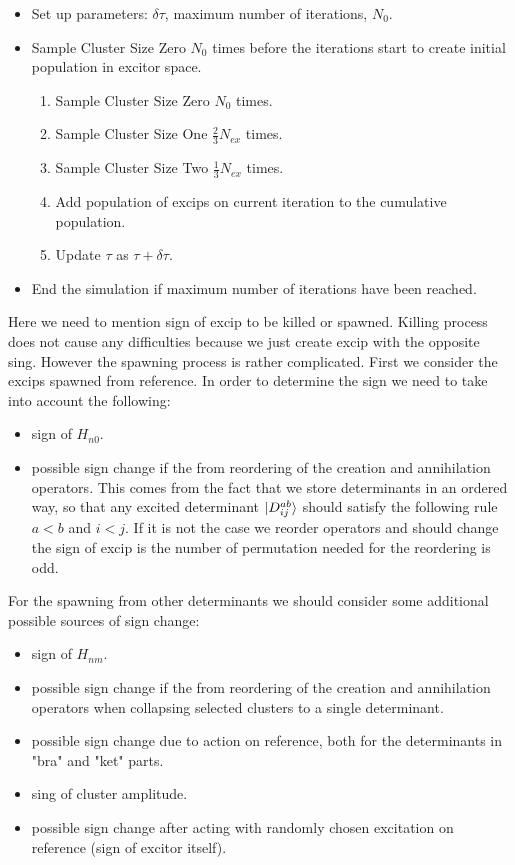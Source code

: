 \documentclass[twoside,english]{uiofysmaster}
\theoremstyle{definition}
\begin{document}
\begin{tcolorbox}
	\begin{itemize}
		\item Set up parameters: $\delta\tau$, maximum number of iterations, $N_0$.
		\item Sample Cluster Size Zero $N_0$ times before the iterations start to create initial population in excitor space.
		\begin{enumerate} 
			\item Sample Cluster Size Zero $N_0$ times.
			\item Sample Cluster Size One $\frac{2}{3}N_{ex}$ times.
			\item Sample Cluster Size Two $\frac{1}{3}N_{ex}$ times.
			\item Add population of excips on current iteration to the cumulative population.
			\item Update $\tau$ as $\tau+ \delta\tau$.
		\end{enumerate} 
	\item End the simulation if maximum number of iterations have been reached.
	\end{itemize}
\end{tcolorbox}

Here we need to mention sign of excip to be killed or spawned. Killing process does not cause any difficulties because we just create excip with the opposite sing. However the spawning process is rather complicated. First we consider the excips spawned from reference. In order to determine the sign we need to take into account the following:
\begin{itemize}
\item sign of $H_{n0}$.
\item possible sign change if the from reordering of the creation and annihilation operators. This comes from the fact that we store determinants in an ordered way, so that any excited determinant $\ket{D_{ij}^{ab}}$ should satisfy the following rule $a<b$ and $i<j$. If it is not the case we reorder operators and should change the sign of excip is the number of permutation needed for the reordering is odd.
\end{itemize} 
For the spawning from other determinants we should consider some additional possible sources of sign change:
\begin{itemize}
	\item sign of $H_{nm}$.
	\item possible sign change if the from reordering of the creation and annihilation operators when collapsing selected clusters to a single determinant.
	\item possible sign change due to action on reference, both for the determinants in "bra" and "ket" parts.
	\item sing of cluster amplitude.
	\item possible sign change after acting with randomly chosen excitation on reference (sign of excitor itself).
\end{itemize} 
\end{document}
